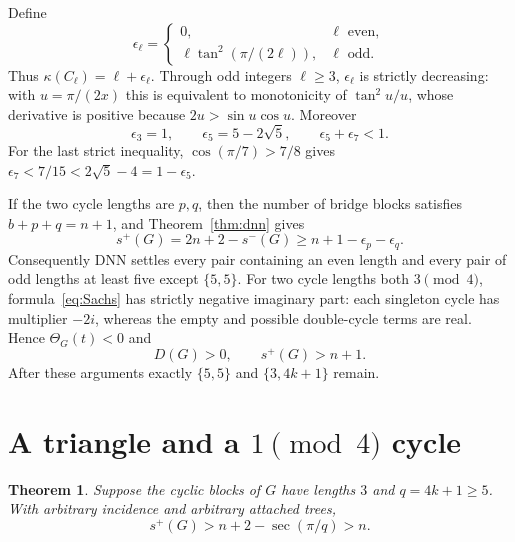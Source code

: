 \documentclass[11pt]{article}
\newtheorem{theorem}{Theorem}[section]
\theoremstyle{remark}
\begin{document}
Define
\begin{equation}\label{eq:epsilon}
 \epsilon_\ell=\begin{cases}0,&\ell\text{ even},\\
 \ell\tan^2(\pi/(2\ell)),&\ell\text{ odd}.
 \end{cases}
\end{equation}
Thus $\kappa(C_\ell)=\ell+\epsilon_\ell$.  Through odd integers
$\ell\geq3$, $\epsilon_\ell$ is strictly decreasing: with
$u=\pi/(2x)$ this is equivalent to monotonicity of $\tan^2u/u$, whose
derivative is positive because $2u>\sin u\cos u$.  Moreover
\begin{equation}\label{eq:eps-values}
 \epsilon_3=1,
 \qquad \epsilon_5=5-2\sqrt5,
 \qquad \epsilon_5+\epsilon_7<1.
\end{equation}
For the last strict inequality, $\cos(\pi/7)>7/8$ gives
$\epsilon_7<7/15<2\sqrt5-4=1-\epsilon_5$.

If the two cycle lengths are $p,q$, then the number of bridge blocks satisfies
$b+p+q=n+1$, and Theorem~\ref{thm:dnn} gives
\begin{equation}\label{eq:dnn-bound}
 s^+(G)=2n+2-s^-(G)\geq n+1-\epsilon_p-\epsilon_q.
\end{equation}
Consequently DNN settles every pair containing an even length and every pair
of odd lengths at least five except $\{5,5\}$.  For two cycle lengths both
$3\pmod4$, formula~\eqref{eq:Sachs} has strictly negative imaginary part:
each singleton cycle has multiplier $-2i$, whereas the empty and possible
double-cycle terms are real.  Hence $\Theta_G(t)<0$ and
\begin{equation}\label{eq:common-phase}
 D(G)>0,\qquad s^+(G)>n+1.
\end{equation}
After these arguments exactly $\{5,5\}$ and $\{3,4k+1\}$ remain.

\section{A triangle and a \texorpdfstring{$1\pmod4$}{1 mod 4} cycle}

\begin{theorem}\label{thm:mixed}
Suppose the cyclic blocks of $G$ have lengths $3$ and $q=4k+1\geq5$.
With arbitrary incidence and arbitrary attached trees,
\[
 s^+(G)>n+2-\sec(\pi/q)>n.
\]
\end{theorem}
\end{document}

